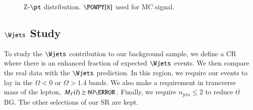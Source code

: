 \begin{figure}[h!tbp]
	\centering
	\hfill
	\caption{Z-$\pt$ distribution. $\POWPY[8]$ used for MC signal.}
	\label{AFig13PN}
\end{figure}




\subsection{$\Wjets$ Study}\label{wjetsstudy}
To study the $\Wjets$ contribution to our background sample, we define a CR where there is an enhanced fraction of expected $\Wjets$ events. We then compare the real data with the  $\Wjets$ prediction. In this region, we require our events to lay in the $\Omega<0$ or $\Omega>1.4$ bands. We also make a requirement in transverse mass of the lepton, $M_T(l)\ge 60 \GeV$. Finally, we require $n_{\text{jets}}\le 2$ to reduce $t\bar{t}$ BG. The other selections of our SR are kept.

